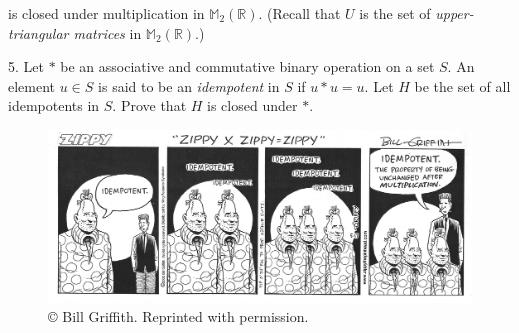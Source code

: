 \documentclass[10pt,]{book}
\theoremstyle{plain}
\theoremstyle{definition}
\theoremstyle{definition}
\theoremstyle{definition}
\theoremstyle{definition}
\numberwithin{equation}{section}
\def\R{\mathbb{R}}
\def\M{\mathbb{M}}
\begin{document}
\begin{exerciselist}
\begin{enumerate}[label=(\alph*)]
\begin{equation*}
\end{equation*}
is closed under multiplication in \(\M_2(\R)\). (Recall that \(U\) is  the set of \emph{upper-triangular matrices} in \(\M_2(\R)\).)%
\end{enumerate}
%
\par\smallskip
\item[5.]\hypertarget{exercise-11}{}Let \(*\) be an associative and commutative binary operation on a set \(S\). An element \(u\in S\) is said to be an \emph{idempotent} in \(S\) if \(u*u=u\). Let \(H\) be the set of all idempotents in \(S\). Prove that \(H\) is closed under \(*\).%
\begin{figure}
\centering
\includegraphics[width=1\linewidth]{zippy.png}
\caption{©  Bill Griffith. Reprinted with permission.\label{zip}}
\end{figure}
\par\smallskip
\end{exerciselist}
\typeout{************************************************}
\typeout{************************************************}
\end{document}
